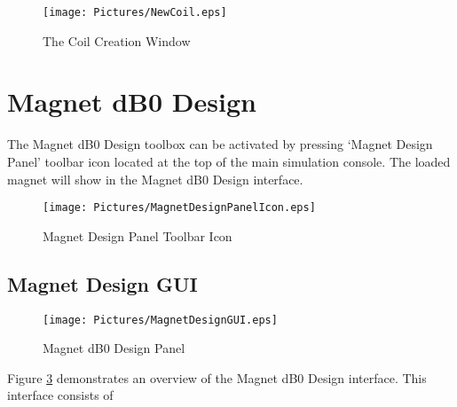 \documentclass{book}%
\begin{document}
\begin{figure}[htbp]
	\centering
		\texttt{[image: Pictures/NewCoil.eps]}
	\caption{The Coil Creation Window}
	\label{fig:NewCoil}
\end{figure}


\section{Magnet dB0 Design}

The Magnet dB0 Design toolbox can be activated by pressing `Magnet Design Panel' toolbar icon located at the top of the main simulation console. The loaded magnet will show in the Magnet dB0 Design interface.

\begin{figure}[htbp]
	\centering
		\texttt{[image: Pictures/MagnetDesignPanelIcon.eps]}
	\caption{Magnet Design Panel Toolbar Icon}
	\label{fig:MagnetDesignPanelIcon}
\end{figure}

\subsection{Magnet Design GUI}

\begin{figure}[htbp]
	\centering
		\texttt{[image: Pictures/MagnetDesignGUI.eps]}
	\caption{Magnet dB0 Design Panel}
	\label{fig:MagnetDesignGUI}
\end{figure}

Figure \ref{fig:MagnetDesignGUI} demonstrates an overview of the Magnet dB0 Design interface. This interface consists of 
\end{document}

